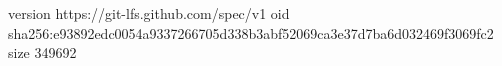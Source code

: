 version https://git-lfs.github.com/spec/v1
oid sha256:e93892edc0054a9337266705d338b3abf52069ca3e37d7ba6d032469f3069fc2
size 349692
